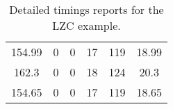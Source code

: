 \begin{table}[h]
{\begin{tabular}{cccccc}
            154.99             & 0                          & 0                          & 17                         & 119                        & 18.99                  \\
            162.3              & 0                          & 0                          & 18                         & 124                        & 20.3                   \\
            154.65             & 0                          & 0                          & 17                         & 119                        & 18.65                  \\
            \bottomrule
        \end{tabular}
    }
    \caption{Detailed timings reports for the LZC example.}
\end{table}



